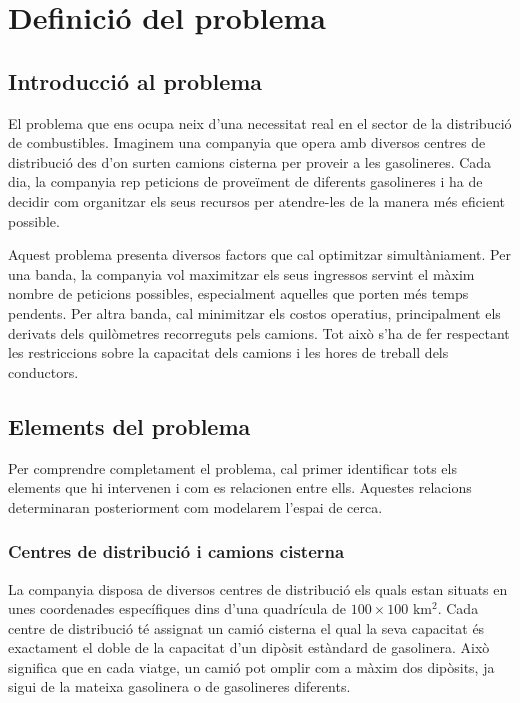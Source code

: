 
\section{Definició del problema}
\label{sec:problem}

\vspace{0.5cm}

\subsection{Introducció al problema}

El problema que ens ocupa neix d'una necessitat real en el sector de la distribució de combustibles. Imaginem una companyia que opera amb diversos centres de distribució des d'on surten camions cisterna per proveir a les gasolineres. Cada dia, la companyia rep peticions de proveïment de diferents gasolineres i ha de decidir com organitzar els seus recursos per atendre-les de la manera més eficient possible.

Aquest problema presenta diversos factors que cal optimitzar simultàniament. Per una banda, la companyia vol maximitzar els seus ingressos servint el màxim nombre de peticions possibles, especialment aquelles que porten més temps pendents. Per altra banda, cal minimitzar els costos operatius, principalment els derivats dels quilòmetres recorreguts pels camions. Tot això s'ha de fer respectant les restriccions sobre la capacitat dels camions i les hores de treball dels conductors.

\vspace{0.5cm}

\subsection{Elements del problema}

Per comprendre completament el problema, cal primer identificar tots els elements que hi intervenen i com es relacionen entre ells. Aquestes relacions determinaran posteriorment com modelarem l'espai de cerca.

\vspace{0.5cm}

\subsubsection{Centres de distribució i camions cisterna}

La companyia disposa de diversos centres de distribució els quals estan situats en unes coordenades específiques dins d'una quadrícula de $100 \times 100$ km$^2$. Cada centre de distribució té assignat un camió cisterna el qual la seva capacitat és exactament el doble de la capacitat d'un dipòsit estàndard de gasolinera. Això significa que en cada viatge, un camió pot omplir com a màxim dos dipòsits, ja sigui de la mateixa gasolinera o de gasolineres diferents.

